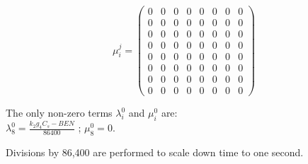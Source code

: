 $$
  \mu_i^j =
  \begin{pmatrix}
   0 & 0 & 0 & 0 & 0 & 0 & 0 & 0 \\
   0 & 0 & 0 & 0 & 0 & 0 & 0 & 0 \\
   0 & 0 & 0 & 0 & 0 & 0 & 0 & 0 \\
   0 & 0 & 0 & 0 & 0 & 0 & 0 & 0 \\
   0 & 0 & 0 & 0 & 0 & 0 & 0 & 0 \\
   0 & 0 & 0 & 0 & 0 & 0 & 0 & 0 \\
   0 & 0 & 0 & 0 & 0 & 0 & 0 & 0 \\
   0 & 0 & 0 & 0 & 0 & 0 & 0 & 0
  \end{pmatrix}
$$

The only non-zero terms $\lambda_i^0$ and $\mu_i^0$ are:\\

$\lambda_8^0 = \frac{k_2 g_4 C_s - BEN}{86400}$ ; $\mu_8^0 = 0$.

Divisions by 86,400 are performed to scale down time to one second.
